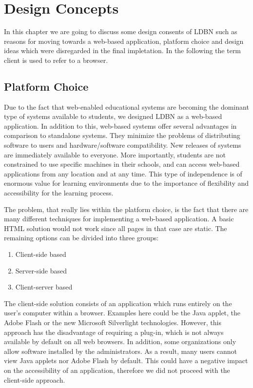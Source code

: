 \chapter{Design Concepts}
\label{chap:design}
In this chapter we are going to discuss some design consents of LDBN such as
reasons for moving towards a web-based application, platform choice and 
design ideas which were disregarded in the final impletation. In the following the
term client is used to refer to a browser.

\section{Platform Choice}
Due to the fact that web-enabled educational 
systems are becoming the dominant type of systems 
available to students, we designed LDBN as a web-based application.
In addition to this, web-based systems offer several advantages in comparison to 
standalone systems. They minimize the problems of distributing software to users 
and hardware/software compatibility. New releases of systems are immediately
available to everyone. More importantly, students are not
constrained to use specific machines in their schools, and can access 
web-based applications from any location and at any time. This type of independence 
is of enormous value for learning environments due to the importance of
flexibility and accessibility for the learning process.
 
The problem, that really lies within the platform choice, is the fact that there are
many different techniques for implementing a web-based application. A basic HTML 
solution would not work since all pages in that case are static. The remaining 
options can be divided into three groups:

\begin{enumerate}
	\item Client-side based
	\item Server-side based
	\item Client-server based
\end{enumerate}

The client-side solution consists of an application which runs entirely on the user's 
computer within a browser. Examples here could be the Java applet, the Adobe Flash or the new 
Microsoft Silverlight technologies. However, this approach has the disadvantage
of requiring a plug-in, which is not always available by default on all web browsers. 
In addition, some organizations only allow software installed by the administrators. 
As a result, many users cannot view Java applets nor Adobe Flash by default. This could 
have a negative impact on the accessibility of an application, 
therefore we did not proceed with the client-side approach.

